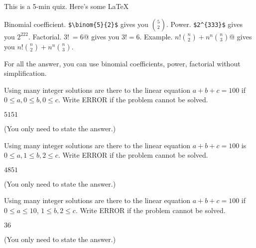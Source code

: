 

\renewcommand\AUTHOR{nweadick1@cougars.ccis.edu} %


\topmattertwo

This is a 5-min quiz.
Here's some \LaTeX\:
\begin{enumerate}[nosep]
\li Binomial coefficient. \verb!$\binom{5}{2}$! gives you $\binom{5}{2}$.
\li Power. \verb!$2^{333}$! gives you $2^{222}$.
\li Factorial. \verb@$3!\ = 6$@ gives you $3! = 6$.
\li Example. \verb@$n!\binom{n}{2} + n^n\binom{n}{3}$@
gives you $n!\binom{n}{2} + n^n\binom{n}{3}$.
\end{enumerate}
For all the answer, you can use binomial coefficients, power, factorial
without simplification.

\nextq
Using many integer solutions are there to the linear equation
$a + b + c = 100$ if $0 \leq a, 0 \leq b, 0 \leq c$.
Write ERROR if the problem cannot be solved.
\\
\ANSWER
\begin{answerlong}
$5151$
\end{answerlong}
(You only need to state the answer.)

\nextq
Using many integer solutions are there to the linear equation
$a + b + c = 100$
is $0 \leq a, 1 \leq b, 2 \leq c$.
Write ERROR if the problem cannot be solved.
\\
\ANSWER
\begin{answerlong}
$4851 $
\end{answerlong}
(You only need to state the answer.)

\nextq
Using many integer solutions are there to the linear equation
$a + b + c = 100$
if $0 \leq a \leq 10$, $1 \leq b, 2 \leq c$.
Write ERROR if the problem cannot be solved.
\\
\ANSWER
\begin{answerlong}
$ 36$
\end{answerlong}
(You only need to state the answer.)


\newpage


